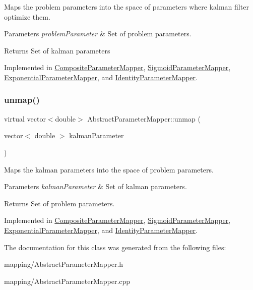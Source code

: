 Maps the problem parameters into the space of parameters where kalman filter optimize them. 
\begin{DoxyParams}{Parameters}
{\em problem\+Parameter} & Set of problem parameters. \\
\hline
\end{DoxyParams}
\begin{DoxyReturn}{Returns}
Set of kalman parameters 
\end{DoxyReturn}


Implemented in \mbox{\hyperlink{classCompositeParameterMapper_abac90f20835ad311cfdfc952956b9624}{Composite\+Parameter\+Mapper}}, \mbox{\hyperlink{classSigmoidParameterMapper_a808db49587ff6c2d2c2b2efc84de80f6}{Sigmoid\+Parameter\+Mapper}}, \mbox{\hyperlink{classExponentialParameterMapper_a6abcf5b0efb8ef01ced062b7498c923e}{Exponential\+Parameter\+Mapper}}, and \mbox{\hyperlink{classIdentityParameterMapper_a21105fcfd2e89ac5529f97433f03b1c3}{Identity\+Parameter\+Mapper}}.

\mbox{\label{classAbstractParameterMapper_a7fc9715759582e218a3bc38ec43e2d57}} 
\subsubsection{\texorpdfstring{unmap()}{unmap()}}
{\footnotesize\ttfamily virtual vector$<$double$>$ Abstract\+Parameter\+Mapper\+::unmap (\begin{DoxyParamCaption}\item[{vector$<$ double $>$}]{kalman\+Parameter }\end{DoxyParamCaption})\hspace{0.3cm}{\ttfamily [pure virtual]}}

Maps the kalman parameters into the space of problem parameters. 
\begin{DoxyParams}{Parameters}
{\em kalman\+Parameter} & Set of kalman parameters. \\
\hline
\end{DoxyParams}
\begin{DoxyReturn}{Returns}
Set of problem parameters. 
\end{DoxyReturn}


Implemented in \mbox{\hyperlink{classCompositeParameterMapper_a15d15009cf9026b22f27f5d8a5880a4e}{Composite\+Parameter\+Mapper}}, \mbox{\hyperlink{classSigmoidParameterMapper_a5b7031c2945f69130e0423427525e256}{Sigmoid\+Parameter\+Mapper}}, \mbox{\hyperlink{classExponentialParameterMapper_ad7040a1ac834e53691bd157df925c545}{Exponential\+Parameter\+Mapper}}, and \mbox{\hyperlink{classIdentityParameterMapper_ad7ad11e683701104024a553eb8f2373b}{Identity\+Parameter\+Mapper}}.



The documentation for this class was generated from the following files\+:\begin{DoxyCompactItemize}
\item 
mapping/Abstract\+Parameter\+Mapper.\+h\item 
mapping/Abstract\+Parameter\+Mapper.\+cpp\end{DoxyCompactItemize}
